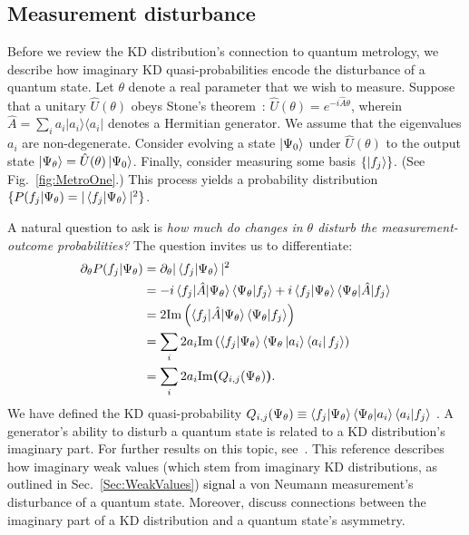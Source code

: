 \documentclass[%
 reprint,
superscriptaddress,
nofootinbib,
bibnotes,
 amsmath,amssymb,
 aps,
]{revtex4-1}
\theoremstyle{plain}
\newcommand*{\ketbra}[2]{\lvert #1 \rangle\!\langle #2 \rvert}
\newcommand{\Dave}[1]{\textcolor{black}{#1} }
\newcommand{\im}{\mathrm{Im}}
\newcommand{\Pt}{\partial_{\theta}}
\newcommand{\PsiT}{\Psi_{\theta}}
\begin{document}
\subsection{Measurement disturbance}
\label{SubSec:Disturb}

Before we review the KD distribution's connection to quantum metrology, we describe how imaginary KD quasi-probabilities encode the disturbance of a quantum state. 
Let $\theta$ denote a real parameter that we wish to measure.
Suppose that a unitary $\hat{U}(\theta)$ obeys Stone's theorem~\cite{Stone32}: 
$\hat{U}(\theta) = e^{-i \hat{A} \theta}$,
wherein $\hat{A} = \sum_i a_i \ketbra{a_i}{a_i}$ denotes a Hermitian generator. We assume that the eigenvalues $a_i$ are non-degenerate.
Consider  evolving a state $\ket{\Psi_0}$ under $\hat{U}(\theta)$
to the output state $\ket{\Psi_{\theta}} = \hat{U}(\theta) \ket{\Psi_0}$.  Finally, consider measuring some basis $\{ \ket{f_j} \}$. (See Fig.~\ref{fig:MetroOne}.) This process yields a probability distribution $\{ P(f_j | \Psi_{\theta} ) = |\braket{f_j|\Psi_{\theta} } |^2 \}$. 

A natural question to ask is \emph{how much do changes in $\theta$ disturb the measurement-outcome probabilities?} The question invites us to differentiate:
\begin{align}
 \Pt  P(f_j | \Psi_{\theta} ) & =  \Pt |\braket{f_j |\Psi_{\theta} } |^2  \nonumber \\
 & =-i \braket{f_j |\hat{A}|\Psi_{\theta} } \braket{\Psi_{\theta}|f_j}  + i \braket{f_j|\Psi_{\theta} } \braket{\Psi_{\theta}|\hat{A}|f_j} \nonumber  \\
 & = 2 \im \left( \braket{f_j|\hat{A}|\Psi_{\theta}} \braket{\Psi_{\theta}|f_j }  \right)
  \nonumber  \\
 & = \sum_i 2 a_i \im \left( \braket{f_j|\Psi_{\theta} } \braket{\Psi_{\theta}\ket{a_i} \bra{a_i} f_j} \right) 
  \nonumber  \\
 & = \sum_i 2 a_i \im \bm{(} Q_{i,j}(\PsiT)  \bm{)} .
 \label{Eq:ImagDist}
\end{align}
We have defined the KD quasi-probability
\Dave{$Q_{i,j}(\PsiT) \equiv \braket{f_j|\Psi_{\theta}}\braket{\Psi_{\theta}|a_i} \braket{a_i|f_j }  $}.  A generator's ability to disturb a quantum state is related to  a KD distribution's imaginary part. For further results on this topic, see~\cite{Dressel12-2}. This reference describes how imaginary weak values (which stem from imaginary KD distributions, as outlined in Sec.~\ref{Sec:WeakValues}) \Dave{signal} a von Neumann measurement's disturbance of a quantum state.  Moreover,  \cite{Budiyono_2023_as,Budiyono_PRA_23} discuss connections between the imaginary part of a KD distribution and a quantum state's asymmetry. 
\end{document}
